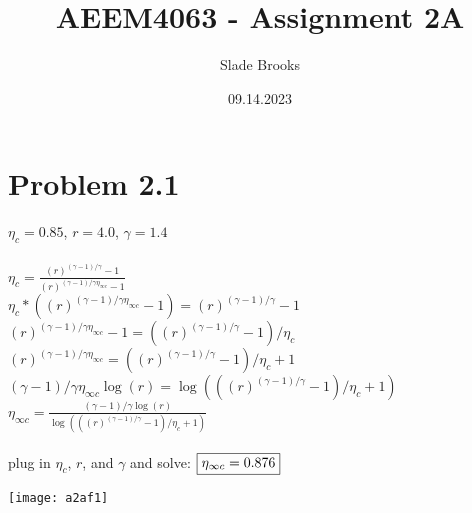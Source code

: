 \documentclass{article}
\title{AEEM4063 - Assignment 2A}
\author{Slade Brooks}
\date{09.14.2023}
\begin{document}
\maketitle

\section*{Problem 2.1}
$\eta_c = 0.85$, $r=4.0$, $\gamma=1.4$ \\\\
$\eta_c = \frac{(r)^{(\gamma-1)/\gamma}-1}{(r)^{(\gamma-1)/\gamma\eta_{\infty c}}-1}$ \\
$\eta_c*((r)^{(\gamma-1)/\gamma\eta_{\infty c}}-1)=(r)^{(\gamma-1)/\gamma}-1$ \\
$(r)^{(\gamma-1)/\gamma\eta_{\infty c}}-1=((r)^{(\gamma-1)/\gamma}-1)/\eta_c$ \\
$(r)^{(\gamma-1)/\gamma\eta_{\infty c}}=((r)^{(\gamma-1)/\gamma}-1)/\eta_c+1$ \\
$(\gamma-1)/\gamma\eta_{\infty c}\log(r)=\log(((r)^{(\gamma-1)/\gamma}-1)/\eta_c+1)$ \\
$\eta_{\infty c}=\frac{(\gamma-1)/\gamma\log(r)}{\log(((r)^{(\gamma-1)/\gamma}-1)/\eta_c+1)}$ \\\\
plug in $\eta_c$, $r$, and $\gamma$ and solve:
$\fbox{$\eta_{\infty c}=0.876$}$ \\
\begin{center}
    \texttt{[image: a2af1]}  
\end{center}
\end{document}
